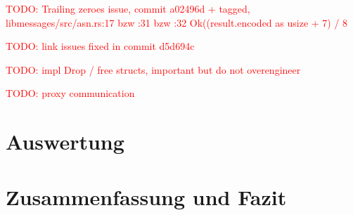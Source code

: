\documentclass[
	12pt,
	table,
	bigheadings,
	ngerman,
	a4paper,
	BCOR5mm,
	DIV14,
	1.1headlines,
	pagesize,
	oneside,
	openright,
	titlepage,
	headsepline,
	nochapterprefix,
	bibtotoc,
	tocindent,
	listsindent,
	pointlessnumbers,
	cleardoubleempty,
	fleqn,
	halfparskip
]{scrbook}
\newcommand{\todo}[1]{\textcolor{red}{TODO: #1}}
\begin{document}
		\todo{Trailing zeroes issue, commit a02496d + tagged, libmessages/src/asn.rs:17 bzw :31 bzw :32 Ok((result.encoded as usize + 7) / 8}
		
		\todo{link issues fixed in commit d5d694c}
		
		\todo{impl Drop / free structs, important but do not overengineer}
		
		\todo{proxy communication}
			
			
	\chapter{Auswertung}
	
	\chapter{Zusammenfassung und Fazit}
	
	
	
	
	\clearpage
	\normalem
	\printbibliography
	
	\clearpage
	\printglossary[type=\acronymtype]

	\clearpage
	\listoffigures
	\lstlistoflistings
	
	
\end{document}
